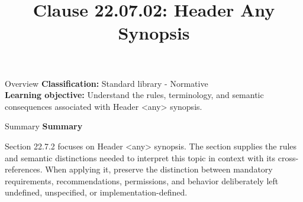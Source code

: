 \documentclass[10pt,letterpaper]{article}
\title{Clause 22.07.02: Header Any Synopsis}
\author{}
\date{}
\begin{document}
\maketitle
\begin{CornellOverviewBox}{Overview}
\textbf{Classification:} Standard library - Normative\\[2pt]
\textbf{Learning objective:} Understand the rules, terminology, and semantic consequences associated with Header <any> synopsis.
\end{CornellOverviewBox}\begin{CornellSummaryBox}{Summary}
{\sffamily\bfseries\color{Accent} Summary}\par\vspace{3pt}Section 22.7.2 focuses on Header <any> synopsis. The section supplies the rules and semantic distinctions needed to interpret this topic in context with its cross-references. When applying it, preserve the distinction between mandatory requirements, recommendations, permissions, and behavior deliberately left undefined, unspecified, or implementation-defined.
\end{CornellSummaryBox}
\end{document}
